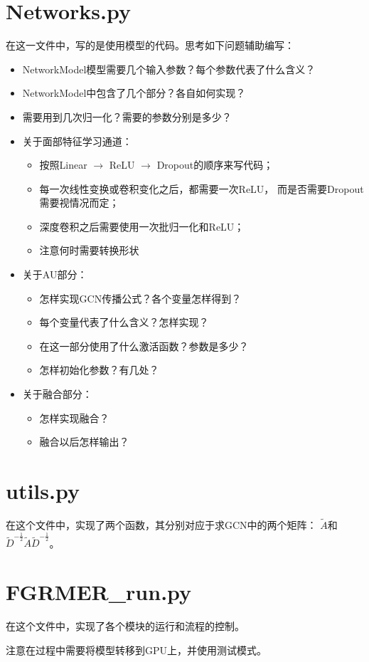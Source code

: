 \documentclass[AutoFakeBold]{MyFormat}
\begin{document}
\section{Networks.py}
\par 在这一文件中，写的是使用模型的代码。思考如下问题辅助编写：
\begin{itemize}
    \item NetworkModel模型需要几个输入参数？每个参数代表了什么含义？
    \item NetworkModel中包含了几个部分？各自如何实现？
    \item 需要用到几次归一化？需要的参数分别是多少？
    \item 关于面部特征学习通道：
    \begin{itemize}
        \item 按照Linear $\to$ ReLU $\to$ Dropout的顺序来写代码；
        \item 每一次线性变换或卷积变化之后，都需要一次ReLU，
        而是否需要Dropout需要视情况而定；
        \item 深度卷积之后需要使用一次批归一化和ReLU；
        \item 注意何时需要转换形状
    \end{itemize}
    \item 关于AU部分：
    \begin{itemize}
        \item 怎样实现GCN传播公式？各个变量怎样得到？
        \item 每个变量代表了什么含义？怎样实现？
        \item 在这一部分使用了什么激活函数？参数是多少？
        \item 怎样初始化参数？有几处？
    \end{itemize}
    \item 关于融合部分：
    \begin{itemize}
        \item 怎样实现融合？
        \item 融合以后怎样输出？
    \end{itemize}
\end{itemize}


\section{utils.py}
\par 在这个文件中，实现了两个函数，其分别对应于求GCN中的两个矩阵：
$\tilde A$和$\tilde D^{-\frac{1}{2}}\tilde A\tilde D^{-\frac{1}{2}}$。


\section{FGRMER\_run.py}
\par 在这个文件中，实现了各个模块的运行和流程的控制。
\par 注意在过程中需要将模型转移到GPU上，并使用测试模式。
\end{document}
